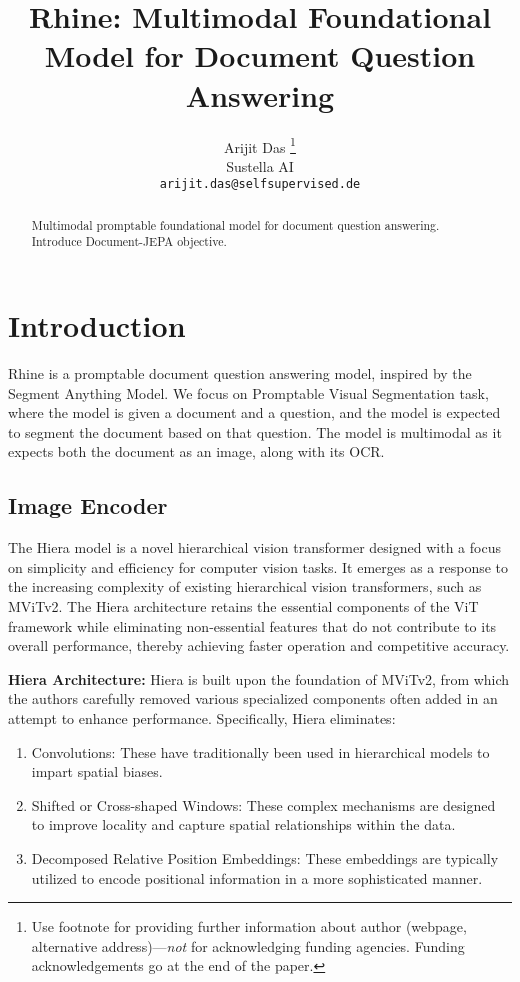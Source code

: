 \documentclass{article} %
\title{Rhine: Multimodal Foundational Model for Document Question Answering}
\author{Arijit Das \thanks{ Use footnote for providing further information
about author (webpage, alternative address)---\emph{not} for acknowledging
funding agencies.  Funding acknowledgements go at the end of the paper.} \\
Sustella AI\\
\texttt{arijit.das@selfsupervised.de}
}
\begin{document}
\maketitle

\begin{abstract}
Multimodal promptable foundational model for document question answering. Introduce Document-JEPA objective. 
\end{abstract}

\section{Introduction}

Rhine is a promptable document question answering model, inspired by the Segment Anything Model. We focus on Promptable Visual Segmentation task, where the model is given a document and a question, and the model is expected to segment the document based on that question. The model is multimodal as it expects both the document as an image, along with its OCR. 

\subsection{Image Encoder}
The Hiera model is a novel hierarchical vision transformer designed with a focus on simplicity and efficiency for computer vision tasks. It emerges as a response to the increasing complexity of existing hierarchical vision transformers, such as MViTv2. The Hiera architecture retains the essential components of the ViT framework while eliminating non-essential features that do not contribute to its overall performance, thereby achieving faster operation and competitive accuracy.

{\bf Hiera Architecture:}
Hiera is built upon the foundation of MViTv2, from which the authors carefully removed various specialized components often added in an attempt to enhance performance. Specifically, Hiera eliminates:
\begin{enumerate}
   \item Convolutions: These have traditionally been used in hierarchical models to impart spatial biases.
   \item Shifted or Cross-shaped Windows: These complex mechanisms are designed to improve locality and capture spatial relationships within the data.
   \item Decomposed Relative Position Embeddings: These embeddings are typically utilized to encode positional information in a more sophisticated manner.
\end{enumerate}
\end{document}

